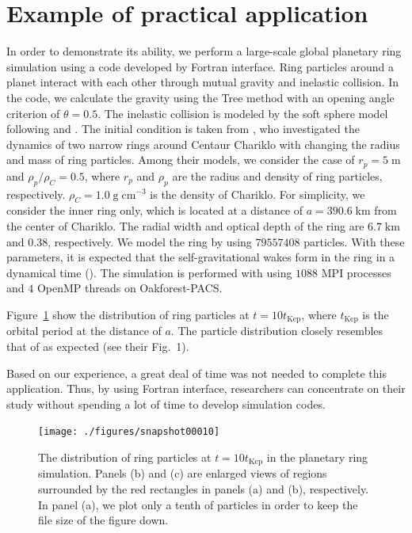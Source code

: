 \documentclass[proof,useamsfonts]{pasj01}
\begin{document}
\section{Example of practical application}
\label{sec:example}
% 
In order to demonstrate its ability, we perform a large-scale global planetary ring simulation using a code developed by Fortran interface. Ring particles around a planet interact with each other through mutual gravity and inelastic collision. In the code, we calculate the gravity using the Tree method with an opening angle criterion of $\theta=0.5$. The inelastic collision is modeled by the soft sphere model following \citet{salo95:simulat_of_dense_planetary} and \citet{michikoshi17a:_simulat_smallest}. The initial condition is taken from \citet{michikoshi17a:_simulat_smallest}, who investigated the dynamics of two narrow rings around Centaur Chariklo with changing the radius and mass of ring particles. Among their models, we consider the case of $r_{p}=5\;\mathrm{m}$ and $\rho_{p}/\rho_{C}=0.5$, where $r_{p}$ and $\rho_{p}$ are the radius and density of ring particles, respectively. $\rho_{C}=1.0\;\mathrm{g\;cm^{-3}}$ is the density of Chariklo. For simplicity, we consider the inner ring only, which is located at a distance of $a=390.6\; \mathrm{km}$ from the center of Chariklo. The radial width and optical depth of the ring are $6.7\;\mathrm{km}$ and $0.38$, respectively.  We model the ring by using $79557408$ particles. With these parameters, it is expected that the self-gravitational wakes form in the ring in a dynamical time (\cite{toomre64:on_the_grav_instab_}). The simulation is performed with using $1088$ MPI processes and $4$ OpenMP threads on Oakforest-PACS.

Figure~\ref{fig:planetary_ring} show the distribution of ring particles at $t=10t_{\mathrm{Kep}}$, where $t_{\mathrm{Kep}}$ is the orbital period at the distance of $a$. The particle distribution closely resembles that of \citet{michikoshi17a:_simulat_smallest} as expected (see their Fig.~1). 

Based on our experience, a great deal of time was not needed to complete this application. Thus, by using Fortran interface, researchers can concentrate on their study without spending a lot of time to develop simulation codes.


\begin{figure}[htbp]
\begin{center}
\texttt{[image: ./figures/snapshot00010]}  
\end{center}
\caption{The distribution of ring particles at $t=10t_{\mathrm{Kep}}$ in the planetary ring simulation. Panels (b) and (c) are enlarged views of regions surrounded by the red rectangles in panels (a) and (b), respectively. In panel (a), we plot only a tenth of particles in order to keep the file size of the figure down.}
\label{fig:planetary_ring}  
\end{figure}
\end{document}

